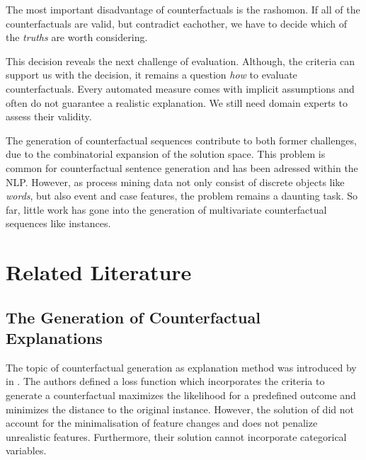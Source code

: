 \documentclass[12pt,a4paper]{report}
\begin{document}
The most important disadvantage of counterfactuals is the \gls{rashomon}\autocite[ch. 9.3]{molnar2019}. If all of the counterfactuals are valid, but contradict eachother, we have to decide which of the \emph{truths} are worth considering.

This decision reveals the next challenge of evaluation\needscite. Although, the criteria can support us with the decision, it remains a question \emph{how} to evaluate counterfactuals. Every automated measure comes with implicit assumptions and often do not guarantee a realistic explanation. We still need domain experts to assess their validity.

The generation of counterfactual sequences contribute to both former challenges, due to the combinatorial expansion of the solution space. This problem is common for counterfactual sentence generation and has been adressed within the \gls{NLP}\needscite. However, as process mining data not only consist of discrete objects like \emph{words}, but also event and case features, the problem remains a daunting task. So far, little work has gone into the generation of multivariate counterfactual sequences like \glspl{instance}\needscite.




\section{Related Literature}
\subsection{The Generation of Counterfactual Explanations}
The topic of counterfactual generation as explanation method was introduced by \citeauthor{wachter_CounterfactualExplanationsOpening_2017} in \citeyear{wachter_CounterfactualExplanationsOpening_2017}\needscite. The authors defined a loss function which incorporates the criteria to generate a counterfactual maximizes the likelihood for a predefined outcome and minimizes the distance to the original instance. However, the solution of \citeauthor{wachter_CounterfactualExplanationsOpening_2017} did not account for the minimalisation of feature changes and does not penalize unrealistic features. Furthermore, their solution cannot incorporate categorical variables.
\end{document}
